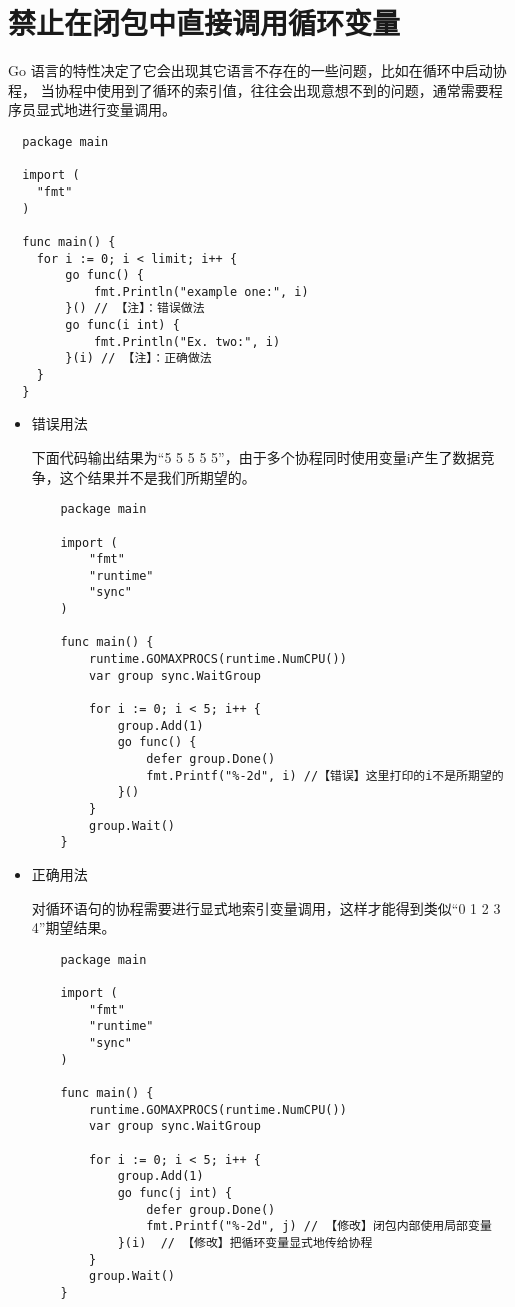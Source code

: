 \section{禁止在闭包中直接调用循环变量}
Go 语言的特性决定了它会出现其它语言不存在的一些问题，比如在循环中启动协程，
当协程中使用到了循环的索引值，往往会出现意想不到的问题，通常需要程序员显式地进行变量调用。
\begin{verbatim}
  package main

  import (
  	"fmt"
  )

  func main() {
  	for i := 0; i < limit; i++ {
  		go func() {
  			fmt.Println("example one:", i)
  		}() // 【注】：错误做法
  		go func(i int) {
  			fmt.Println("Ex. two:", i)
  		}(i) // 【注】：正确做法
  	}
  }
\end{verbatim}

\begin{itemize}[leftmargin=4em]
\item 错误用法

  下面代码输出结果为“5 5 5 5 5”，由于多个协程同时使用变量i产生了数据竞争，这个结果并不是我们所期望的。
  \begin{verbatim}
    package main

    import (
    	"fmt"
    	"runtime"
    	"sync"
    )

    func main() {
    	runtime.GOMAXPROCS(runtime.NumCPU())
    	var group sync.WaitGroup

    	for i := 0; i < 5; i++ {
    		group.Add(1)
    		go func() {
    			defer group.Done()
    			fmt.Printf("%-2d", i) //【错误】这里打印的i不是所期望的
    		}()
    	}
    	group.Wait()
    }
  \end{verbatim}
\item 正确用法

  对循环语句的协程需要进行显式地索引变量调用，这样才能得到类似“0 1 2 3 4”期望结果。
  \begin{verbatim}
    package main

    import (
    	"fmt"
    	"runtime"
    	"sync"
    )

    func main() {
    	runtime.GOMAXPROCS(runtime.NumCPU())
    	var group sync.WaitGroup

    	for i := 0; i < 5; i++ {
    		group.Add(1)
    		go func(j int) {
    			defer group.Done()
    			fmt.Printf("%-2d", j) // 【修改】闭包内部使用局部变量
    		}(i)  // 【修改】把循环变量显式地传给协程
    	}
    	group.Wait()
    }
  \end{verbatim}
\end{itemize}

